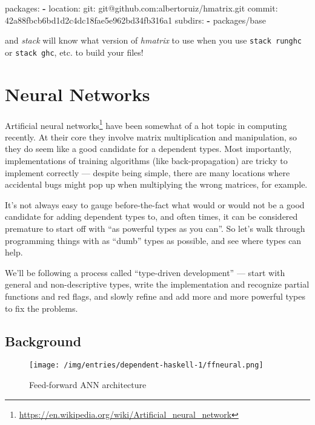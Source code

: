\documentclass[]{article}
\newenvironment{Shaded}{}{}
\newcommand{\KeywordTok}[1]{\textcolor[rgb]{0.00,0.44,0.13}{\textbf{{#1}}}}
\newcommand{\FunctionTok}[1]{\textcolor[rgb]{0.02,0.16,0.49}{{#1}}}
\newcommand{\NormalTok}[1]{{#1}}
\renewcommand{\href}[2]{#2\footnote{\url{#1}}}
\begin{document}
\begin{Shaded}
\begin{Highlighting}[]
\FunctionTok{packages:}
\KeywordTok{-} \FunctionTok{location:}
    \FunctionTok{git:} \NormalTok{git@github.com:albertoruiz/hmatrix.git}
    \FunctionTok{commit:} \NormalTok{42a88fbcb6bd1d2c4dc18fae5e962bd34fb316a1}
  \FunctionTok{subdirs:}
    \KeywordTok{-} \NormalTok{packages/base}
\end{Highlighting}
\end{Shaded}

and \emph{stack} will know what version of \emph{hmatrix} to use when
you use \texttt{stack\ runghc} or \texttt{stack\ ghc}, etc. to build
your files!

\section{Neural Networks}\label{neural-networks}

\href{https://en.wikipedia.org/wiki/Artificial_neural_network}{Artificial
neural networks} have been somewhat of a hot topic in computing
recently. At their core they involve matrix multiplication and
manipulation, so they do seem like a good candidate for a dependent
types. Most importantly, implementations of training algorithms (like
back-propagation) are tricky to implement correctly --- despite being
simple, there are many locations where accidental bugs might pop up when
multiplying the wrong matrices, for example.

It's not always easy to gauge before-the-fact what would or would not be
a good candidate for adding dependent types to, and often times, it can
be considered premature to start off with ``as powerful types as you
can''. So let's walk through programming things with as ``dumb'' types
as possible, and see where types can help.

We'll be following a process called ``type-driven development'' ---
start with general and non-descriptive types, write the implementation
and recognize partial functions and red flags, and slowly refine and add
more and more powerful types to fix the problems.

\subsection{Background}\label{background}

\begin{figure}[htbp]
\centering
\texttt{[image: /img/entries/dependent-haskell-1/ffneural.png]}
\caption{Feed-forward ANN architecture}
\end{figure}
\end{document}
